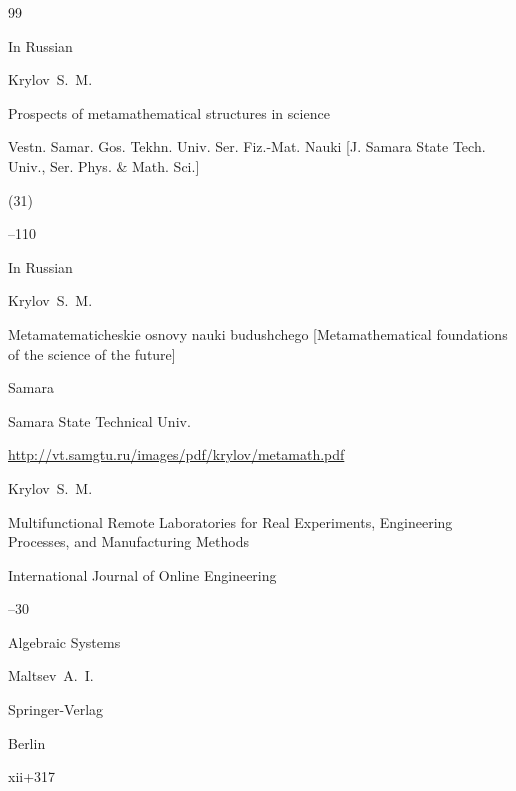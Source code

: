 \begin{thebibliography}{99}

\lang In Russian

\by Krylov~S.~M.

\paper Prospects of metamathematical structures in science

\jour Vestn. Samar. Gos. Tekhn. Univ. Ser. Fiz.-Mat. Nauki \rm [J. Samara State Tech. Univ., Ser. Phys. \& Math. Sci.]


(31)

--110





\lang In Russian

\by Krylov~S.~M.

\book Metamatematicheskie osnovy nauki budushchego \rm [Metamathematical foundations of the science of the future]

\publaddr Samara

\publ  Samara State Technical Univ.



\elink \url{http://vt.samgtu.ru/images/pdf/krylov/metamath.pdf}






\by Krylov~S.~M.

\paper Multifunctional Remote Laboratories for Real Experiments, Engineering Processes, and Manufacturing Methods

\jour International Journal of Online Engineering




--30





\book Algebraic Systems 

\by Maltsev~A.~I.

\publ Springer-Verlag


\publaddr Berlin

\totalpages xii+317 






\end{thebibliography}
